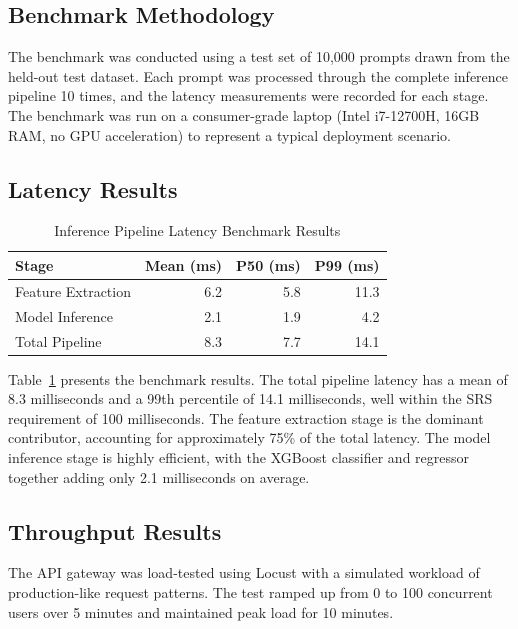 \documentclass[oneside,12pt,a4paper]{report}
\begin{document}
\subsection{Benchmark Methodology}

The benchmark was conducted using a test set of 10,000 prompts drawn from the held-out test dataset. Each prompt was processed through the complete inference pipeline 10 times, and the latency measurements were recorded for each stage. The benchmark was run on a consumer-grade laptop (Intel i7-12700H, 16GB RAM, no GPU acceleration) to represent a typical deployment scenario.

\subsection{Latency Results}

\begin{table}[htbp]
  \centering
  \caption{Inference Pipeline Latency Benchmark Results}
  \label{tab:latency_benchmark}
  \begin{tabular}{lrrr}
    \toprule
    \textbf{Stage} & \textbf{Mean (ms)} & \textbf{P50 (ms)} & \textbf{P99 (ms)} \\
    \midrule
    Feature Extraction & 6.2 & 5.8 & 11.3 \\
    Model Inference & 2.1 & 1.9 & 4.2 \\
    Total Pipeline & 8.3 & 7.7 & 14.1 \\
    \bottomrule
  \end{tabular}
\end{table}

Table~\ref{tab:latency_benchmark} presents the benchmark results. The total pipeline latency has a mean of 8.3 milliseconds and a 99th percentile of 14.1 milliseconds, well within the SRS requirement of 100 milliseconds. The feature extraction stage is the dominant contributor, accounting for approximately 75\% of the total latency. The model inference stage is highly efficient, with the XGBoost classifier and regressor together adding only 2.1 milliseconds on average.

\subsection{Throughput Results}

The API gateway was load-tested using Locust with a simulated workload of production-like request patterns. The test ramped up from 0 to 100 concurrent users over 5 minutes and maintained peak load for 10 minutes.
\end{document}
